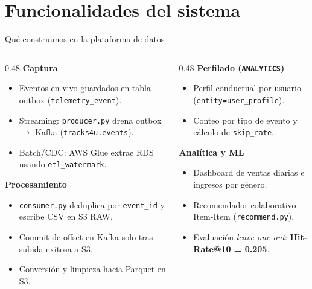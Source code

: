 \documentclass[aspectratio=169,11pt]{beamer}
\begin{document}
\section{Funcionalidades del sistema}
\begin{frame}{Qué construimos en la plataforma de datos}
  \footnotesize
  \begin{columns}[T,onlytextwidth]
    \begin{column}{0.48\textwidth}
      \textbf{\color{accent}Captura}
      \begin{itemize}\setlength{\itemsep}{1pt}
        \item Eventos en vivo guardados en tabla outbox (\texttt{telemetry\_event}).
        \item Streaming: \texttt{producer.py} drena outbox $\rightarrow$ Kafka (\texttt{tracks4u.events}).
        \item Batch/CDC: AWS Glue extrae RDS usando \texttt{etl\_watermark}.
      \end{itemize}
      \vspace{0.6em}
      \textbf{\color{accent}Procesamiento}
      \begin{itemize}\setlength{\itemsep}{1pt}
        \item \texttt{consumer.py} deduplica por \texttt{event\_id} y escribe CSV en S3 RAW.
        \item Commit de offset en Kafka solo tras subida exitosa a S3.
        \item Conversión y limpieza hacia Parquet en S3.
      \end{itemize}
    \end{column}
    \begin{column}{0.48\textwidth}
      \textbf{\color{accent}Perfilado (\texttt{ANALYTICS})}
      \begin{itemize}\setlength{\itemsep}{1pt}
        \item Perfil conductual por usuario (\texttt{entity=user\_profile}).
        \item Conteo por tipo de evento y cálculo de \texttt{skip\_rate}.
      \end{itemize}
      \vspace{0.6em}
      \textbf{\color{accent}Analítica y ML}
      \begin{itemize}\setlength{\itemsep}{1pt}
        \item Dashboard de ventas diarias e ingresos por género.
        \item Recomendador colaborativo Item-Item (\texttt{recommend.py}).
        \item Evaluación \textit{leave-one-out}: \textbf{Hit-Rate@10 = 0.205}.
      \end{itemize}
    \end{column}
  \end{columns}
\end{frame}
\end{document}

